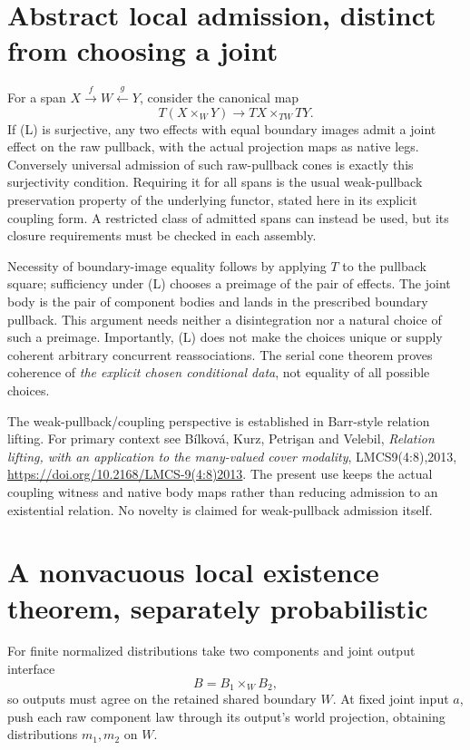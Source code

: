 \documentclass[11pt]{article}
\begin{document}
\section{Abstract local admission, distinct from choosing a joint}
For a span $X\xrightarrow f W\xleftarrow gY$, consider the canonical map
\[
 T(X\times_WY)\longrightarrow TX\times_{TW}TY.\tag{L}
\]
If (L) is surjective, any two effects with equal boundary images admit a joint effect on the raw pullback, with the actual projection maps as native legs. Conversely universal admission of such raw-pullback cones is exactly this surjectivity condition. Requiring it for all spans is the usual weak-pullback preservation property of the underlying functor, stated here in its explicit coupling form. A restricted class of admitted spans can instead be used, but its closure requirements must be checked in each assembly.

Necessity of boundary-image equality follows by applying $T$ to the pullback square; sufficiency under (L) chooses a preimage of the pair of effects. The joint body is the pair of component bodies and lands in the prescribed boundary pullback. This argument needs neither a disintegration nor a natural choice of such a preimage. Importantly, (L) does not make the choices unique or supply coherent arbitrary concurrent reassociations. The serial cone theorem proves coherence of \emph{the explicit chosen conditional data}, not equality of all possible choices.

The weak-pullback/coupling perspective is established in Barr-style relation lifting. For primary context see B\'ilkov\'a, Kurz, Petri\c{s}an and Velebil, \emph{Relation lifting, with an application to the many-valued cover modality}, LMCS9(4:8),2013, \url{https://doi.org/10.2168/LMCS-9(4:8)2013}. The present use keeps the actual coupling witness and native body maps rather than reducing admission to an existential relation. No novelty is claimed for weak-pullback admission itself.

\section{A nonvacuous local existence theorem, separately probabilistic}
For finite normalized distributions take two components and joint output interface
\[
 B=B_1\times_W B_2,
\]
so outputs must agree on the retained shared boundary $W$. At fixed joint input $a$, push each raw component law through its output's world projection, obtaining distributions $m_1,m_2$ on $W$.
\end{document}
